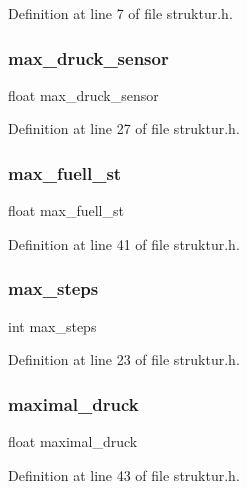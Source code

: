 Definition at line 7 of file struktur.\+h.

\mbox{\label{structramp1_aa6e0bea7d3e9e8f9e91e70c8efba7b9d}} 
\subsubsection{max\+\_\+druck\+\_\+sensor}
{\footnotesize\ttfamily float max\+\_\+druck\+\_\+sensor}



Definition at line 27 of file struktur.\+h.

\mbox{\label{structramp1_a8e0605e8212437f531c811ed888dd383}} 
\subsubsection{max\+\_\+fuell\+\_\+st}
{\footnotesize\ttfamily float max\+\_\+fuell\+\_\+st}



Definition at line 41 of file struktur.\+h.

\mbox{\label{structramp1_a116aef95381445a950272034d8499148}} 
\subsubsection{max\+\_\+steps}
{\footnotesize\ttfamily int max\+\_\+steps}



Definition at line 23 of file struktur.\+h.

\mbox{\label{structramp1_aebad600a8f6e6f3bded1c41f66af9bb4}} 
\subsubsection{maximal\+\_\+druck}
{\footnotesize\ttfamily float maximal\+\_\+druck}



Definition at line 43 of file struktur.\+h.

\mbox{\label{structramp1_ab8e6d2daf3470f1f663c7547d2b5935b}} 
